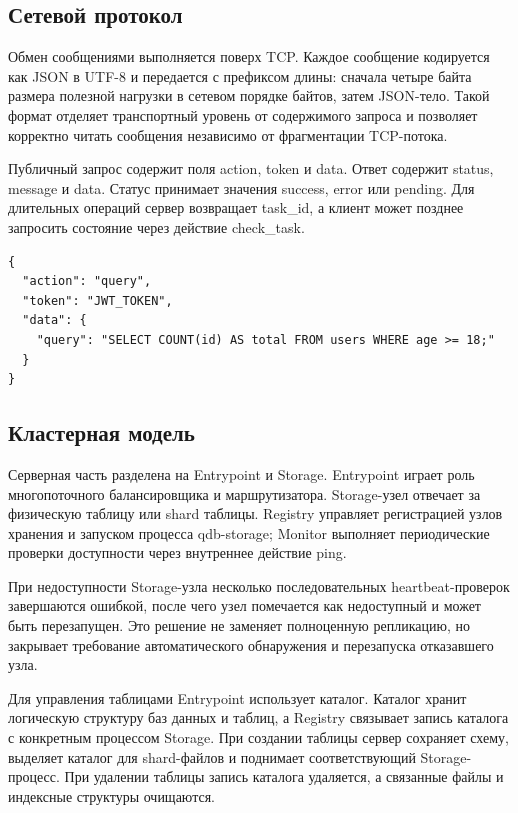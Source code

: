 \documentclass[a4paper,14pt]{extarticle}
\renewcommand{\texttt}[1]{\textrm{#1}}
\begin{document}
\subsection{Сетевой протокол}

Обмен сообщениями выполняется поверх TCP. Каждое сообщение кодируется как JSON в UTF-8 и передается с префиксом длины: сначала четыре байта размера полезной нагрузки в сетевом порядке байтов, затем JSON-тело. Такой формат отделяет транспортный уровень от содержимого запроса и позволяет корректно читать сообщения независимо от фрагментации TCP-потока.

Публичный запрос содержит поля \texttt{action}, \texttt{token} и \texttt{data}. Ответ содержит \texttt{status}, \texttt{message} и \texttt{data}. Статус принимает значения \texttt{success}, \texttt{error} или \texttt{pending}. Для длительных операций сервер возвращает \texttt{task\_id}, а клиент может позднее запросить состояние через действие \texttt{check\_task}.

\begin{lstlisting}[style=qdbcpp,caption={Пример JSON-запроса к публичному API}]
{
  "action": "query",
  "token": "JWT_TOKEN",
  "data": {
    "query": "SELECT COUNT(id) AS total FROM users WHERE age >= 18;"
  }
}
\end{lstlisting}

\subsection{Кластерная модель}

Серверная часть разделена на Entrypoint и Storage. Entrypoint играет роль многопоточного балансировщика и маршрутизатора. Storage-узел отвечает за физическую таблицу или shard таблицы. Registry управляет регистрацией узлов хранения и запуском процесса \texttt{qdb-storage}; Monitor выполняет периодические проверки доступности через внутреннее действие \texttt{ping}.

При недоступности Storage-узла несколько последовательных heartbeat-проверок завершаются ошибкой, после чего узел помечается как недоступный и может быть перезапущен. Это решение не заменяет полноценную репликацию, но закрывает требование автоматического обнаружения и перезапуска отказавшего узла.

Для управления таблицами Entrypoint использует каталог. Каталог хранит логическую структуру баз данных и таблиц, а Registry связывает запись каталога с конкретным процессом Storage. При создании таблицы сервер сохраняет схему, выделяет каталог для shard-файлов и поднимает соответствующий Storage-процесс. При удалении таблицы запись каталога удаляется, а связанные файлы и индексные структуры очищаются.
\end{document}
